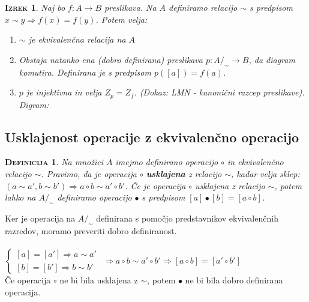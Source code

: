 \documentclass[a4paper,12pt]{article}
\newtheorem*{izrek}{\textsc{Izrek}}
\newtheorem*{definicija}{\textsc{Definicija}}
\begin{document}
\begin{izrek}
Naj bo $f:A\to B$ preslikava. Na $A$ definiramo relacijo $\sim$ s predpisom $x\sim y \Rightarrow f(x)=f(y)$. Potem velja:
\begin{enumerate}
\item[(1)] $\sim$ je ekvivalenčna relacija na $A$
\item[(2)] Obstaja natanko ena (dobro definirana) preslikava $p:A/_\sim \to B$, da diagram \Smiley{} komutira. Definirana je s predpisom $p([a])=f(a)$. 
\item[(3)] $p$ je injektivna in velja $Z_p=Z_f$. (Dokaz: LMN - kanonični razcep preslikave). \linebreak  Digram: \Smiley{} 
\end{enumerate}
\end{izrek}

\subsection{Usklajenost operacije z ekvivalenčno operacijo}

\begin{definicija}
Na množici $A$ imejmo definirano operacijo $\circ$ in ekvivalenčno relacijo $\sim$. \linebreak Pravimo, da je operacija $\circ$ \textbf{usklajena} z relacijo $\sim$, kadar velja sklep: $(a\sim a',b\sim b')\Rightarrow a\circ b \sim a'\circ b'$. Če je operacija $\circ$ usklajena z relacijo $\sim$, potem lahko na $A/_\sim$ definiramo operacijo $\bullet$ s predpisom $[a]\bullet[b]=[a\circ b]$.\\
\end{definicija}

Ker je operacija na $A/_\sim$ definirana s pomočjo predstavnikov ekvivalenčnih razredov, moramo preveriti dobro definiranost. \\

\dashuline{$[a]=[a'],[b]=[b']\Leftrightarrow [a\circ b]=[a'\circ b']$} \\

$
\begin{cases}
[a]=[a']\Rightarrow a\sim a' \\
[b]=[b']\Rightarrow b\sim b'
\end{cases} $
$ \Rightarrow a\circ b \sim a' \circ b'  \Rightarrow [a\circ b]=[a'\circ b']$ \\

Če operacija $\circ$ ne bi bila usklajena z $\sim$, potem $\bullet$ ne bi bila dobro definirana operacija.\\
\end{document}
